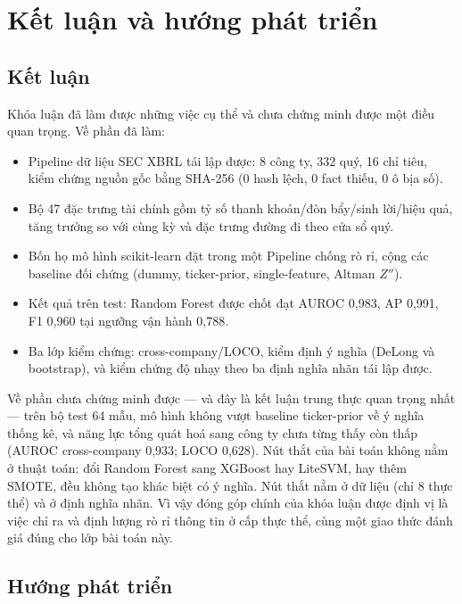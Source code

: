 \chapter{Kết luận và hướng phát triển}

\section{Kết luận}

Khóa luận đã làm được những việc cụ thể và chưa chứng minh được một điều quan trọng. Về phần đã làm:

\begin{itemize}
\item Pipeline dữ liệu SEC XBRL tái lập được: 8 công ty, 332 quý, 16 chỉ tiêu, kiểm chứng nguồn gốc
      bằng SHA-256 (0 hash lệch, 0 fact thiếu, 0 ô bịa số).
\item Bộ 47 đặc trưng tài chính gồm tỷ số thanh khoản/đòn bẩy/sinh lời/hiệu quả, tăng trưởng so với
      cùng kỳ và đặc trưng đường đi theo cửa sổ quý.
\item Bốn họ mô hình scikit-learn đặt trong một Pipeline chống rò rỉ, cộng các baseline đối chứng
      (dummy, ticker-prior, single-feature, Altman $Z''$).
\item Kết quả trên test: Random Forest được chốt đạt AUROC 0,983, AP 0,991, F1 0,960 tại ngưỡng vận
      hành 0,788.
\item Ba lớp kiểm chứng: cross-company/LOCO, kiểm định ý nghĩa (DeLong và bootstrap), và kiểm chứng
      độ nhạy theo ba định nghĩa nhãn tái lập được.
\end{itemize}

Về phần chưa chứng minh được — và đây là kết luận trung thực quan trọng nhất — trên bộ test 64 mẫu,
mô hình không vượt baseline ticker-prior về ý nghĩa thống kê, và năng lực tổng quát hoá sang công ty
chưa từng thấy còn thấp (AUROC cross-company 0,933; LOCO 0,628). Nút thắt của bài toán không nằm ở
thuật toán: đổi Random Forest sang XGBoost hay LiteSVM, hay thêm SMOTE, đều không tạo khác biệt có ý
nghĩa. Nút thắt nằm ở dữ liệu (chỉ 8 thực thể) và ở định nghĩa nhãn. Vì vậy đóng góp chính của khóa
luận được định vị là việc chỉ ra và định lượng rò rỉ thông tin ở cấp thực thể, cùng một giao thức
đánh giá đúng cho lớp bài toán này.

\section{Hướng phát triển}

